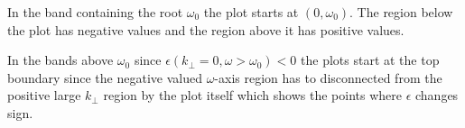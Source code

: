 \documentclass[12pt,a4paper]{article}
\begin{document}
    In the band containing the root $\omega_0$ the plot starts at $(0, \omega_0)$. The region below the plot has negative values and the region above it has positive values.

    In the bands above $\omega_0$ since $\epsilon(k_\perp = 0, \omega > \omega_0) < 0$ the plots start at the top boundary since the negative valued $\omega$-axis region has to disconnected from the positive large $k_\perp$ region by the plot itself which shows the points where $\epsilon$ changes sign.
\end{document}
